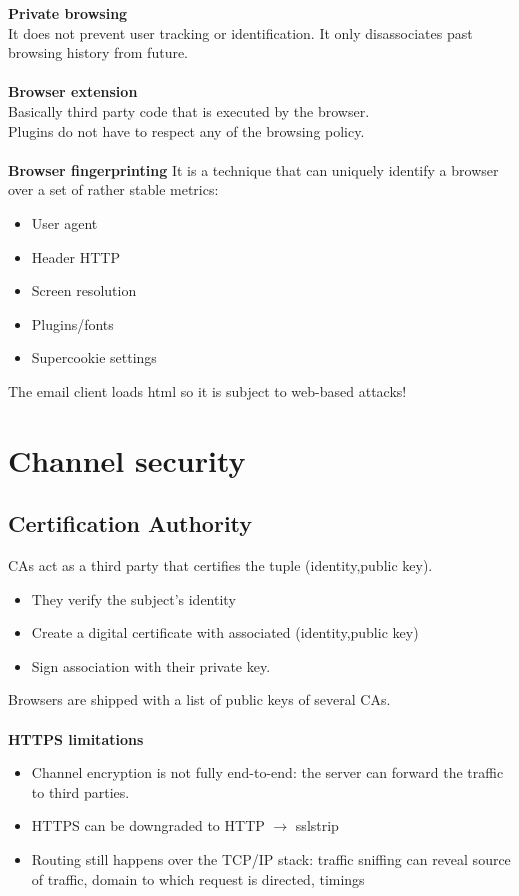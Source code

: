 \documentclass[10pt,a4paper]{book}
\begin{document}
\textbf{Private browsing}\\
It does not prevent user tracking or identification. It only disassociates past browsing history from future.\\\\
\textbf{Browser extension}\\
Basically third party code that is executed by the browser.\\
Plugins do not have to respect any of the browsing policy.\\\\
\textbf{Browser fingerprinting}
It is a technique that can uniquely identify a browser over a set of rather stable metrics:
\begin{itemize}
\item User agent
\item Header HTTP
\item Screen resolution
\item Plugins/fonts
\item Supercookie settings
\end{itemize}

The email client loads html so it is subject to web-based attacks!
\section{Channel security}
\subsection{Certification Authority}
CAs act as a third party that certifies the tuple (identity,public key).
\begin{itemize}
\item They verify the subject's identity
\item Create a digital certificate with associated (identity,public key)
\item Sign association with their private key.
\end{itemize}
Browsers are shipped with a list of public keys of several CAs.\\\\
\textbf{HTTPS limitations}
\begin{itemize}
\item Channel encryption is not fully end-to-end: the server can forward the traffic to third parties.
\item HTTPS can be downgraded to HTTP $\to$ sslstrip
\item Routing still happens over the TCP/IP stack: traffic sniffing can reveal source of traffic, domain to which request is directed, timings
\end{itemize}
\end{document}
